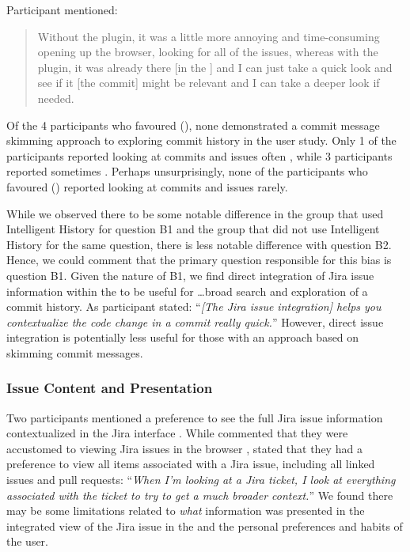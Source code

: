 Participant  mentioned:

\begin{quote}
  Without the plugin, it was a little more annoying and time-consuming opening up the browser, 
  looking for all of the issues, 
  whereas with the plugin, 
  it was already there [in the ] and I can just take a quick look and see if it [the commit] might be relevant and I can take a deeper look if needed.
\end{quote}

Of the 4 participants who favoured (), none demonstrated a commit message skimming approach to exploring commit history in the user study.
Only 1 of the participants reported looking at commits and issues often ,
while 3 participants reported sometimes .
Perhaps unsurprisingly, none of the participants who favoured () reported looking at commits and issues rarely.

While we observed there to be some notable difference in the group that used Intelligent History for question B1 and the group that did not use Intelligent History for the same question,
there is less notable difference with question B2.
Hence, we could comment that the primary question responsible for this bias is question B1.
Given the nature of B1, we find direct integration of Jira issue information within the  to be useful for \dots broad search and exploration of a commit history.
As participant  stated:
``\textit{[The Jira issue integration] helps you contextualize the code change in a commit really quick.}''
However, direct issue integration is potentially less useful for those with an approach based on skimming commit messages.

\subsubsection{Issue Content and Presentation}

Two participants mentioned a preference to see the full Jira issue information contextualized in the Jira interface .
While  commented that they were accustomed to viewing Jira issues in the browser ,
 stated that they had a preference to view all items associated with a Jira issue, including all linked issues and pull requests:
``\textit{When I’m looking at a Jira ticket, I look at everything associated with the ticket to try to get a much broader context.}''
We found there may be some limitations related to \emph{what} information was presented in the integrated view of the Jira issue in the 
and the personal preferences and habits of the user.

